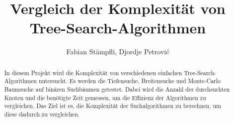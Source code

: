 \documentclass[a4paper,11pt]{article}
\title{Vergleich der Komplexität von \break Tree-Search-Algorithmen}
\author{Fabian Stämpfli, Djordje Petrović}
\begin{document}
\noindent%

\vspace{8cm}




\thispagestyle{empty}
\pagebreak
{}
\thispagestyle{empty}
\begin{abstract}
In diesem Projekt wird die Komplexität von verschiedenen einfachen Tree-Search-Algorithmen untersucht. Es werden die Tiefensuche, Breitensuche und Monte-Carlo Baumsuche auf binären Suchbäumen getestet. Dabei wird die Anzahl der durchsuchten Knoten und die benötigte Zeit gemessen, um die Effizienz der Algorithmen zu vergleichen. Das Ziel ist es, die Komplexität der Suchalgorithmen zu berechnen, um diese dadurch zu vergleichen.
\end{abstract}
\pagebreak
\thispagestyle{empty}
{%
  \hypersetup{hidelinks}
  \tableofcontents
}
\pagebreak

\setcounter{page}{1}

\end{document}
